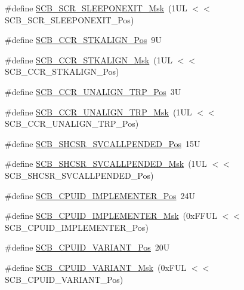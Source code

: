 \begin{DoxyCompactItemize}
\#define \mbox{\hyperlink{group___c_m_s_i_s___s_c_b_ga50a243e317b9a70781b02758d45b05ee}{S\+C\+B\+\_\+\+S\+C\+R\+\_\+\+S\+L\+E\+E\+P\+O\+N\+E\+X\+I\+T\+\_\+\+Msk}}~(1\+U\+L $<$$<$ S\+C\+B\+\_\+\+S\+C\+R\+\_\+\+S\+L\+E\+E\+P\+O\+N\+E\+X\+I\+T\+\_\+\+Pos)
\item 
\#define \mbox{\hyperlink{group___c_m_s_i_s___s_c_b_gac2d20a250960a432cc74da59d20e2f86}{S\+C\+B\+\_\+\+C\+C\+R\+\_\+\+S\+T\+K\+A\+L\+I\+G\+N\+\_\+\+Pos}}~9U
\item 
\#define \mbox{\hyperlink{group___c_m_s_i_s___s_c_b_ga33cf22d3d46af158a03aad25ddea1bcb}{S\+C\+B\+\_\+\+C\+C\+R\+\_\+\+S\+T\+K\+A\+L\+I\+G\+N\+\_\+\+Msk}}~(1\+U\+L $<$$<$ S\+C\+B\+\_\+\+C\+C\+R\+\_\+\+S\+T\+K\+A\+L\+I\+G\+N\+\_\+\+Pos)
\item 
\#define \mbox{\hyperlink{group___c_m_s_i_s___s_c_b_gac4e4928b864ea10fc24dbbc57d976229}{S\+C\+B\+\_\+\+C\+C\+R\+\_\+\+U\+N\+A\+L\+I\+G\+N\+\_\+\+T\+R\+P\+\_\+\+Pos}}~3U
\item 
\#define \mbox{\hyperlink{group___c_m_s_i_s___s_c_b_ga68c96ad594af70c007923979085c99e0}{S\+C\+B\+\_\+\+C\+C\+R\+\_\+\+U\+N\+A\+L\+I\+G\+N\+\_\+\+T\+R\+P\+\_\+\+Msk}}~(1\+U\+L $<$$<$ S\+C\+B\+\_\+\+C\+C\+R\+\_\+\+U\+N\+A\+L\+I\+G\+N\+\_\+\+T\+R\+P\+\_\+\+Pos)
\item 
\#define \mbox{\hyperlink{group___c_m_s_i_s___s_c_b_ga2f93ec9b243f94cdd3e94b8f0bf43641}{S\+C\+B\+\_\+\+S\+H\+C\+S\+R\+\_\+\+S\+V\+C\+A\+L\+L\+P\+E\+N\+D\+E\+D\+\_\+\+Pos}}~15U
\item 
\#define \mbox{\hyperlink{group___c_m_s_i_s___s_c_b_ga6095a7acfbad66f52822b1392be88652}{S\+C\+B\+\_\+\+S\+H\+C\+S\+R\+\_\+\+S\+V\+C\+A\+L\+L\+P\+E\+N\+D\+E\+D\+\_\+\+Msk}}~(1\+U\+L $<$$<$ S\+C\+B\+\_\+\+S\+H\+C\+S\+R\+\_\+\+S\+V\+C\+A\+L\+L\+P\+E\+N\+D\+E\+D\+\_\+\+Pos)
\item 
\#define \mbox{\hyperlink{group___c_m_s_i_s___s_c_b_ga58686b88f94f789d4e6f429fe1ff58cf}{S\+C\+B\+\_\+\+C\+P\+U\+I\+D\+\_\+\+I\+M\+P\+L\+E\+M\+E\+N\+T\+E\+R\+\_\+\+Pos}}~24U
\item 
\#define \mbox{\hyperlink{group___c_m_s_i_s___s_c_b_ga0932b31faafd47656a03ced75a31d99b}{S\+C\+B\+\_\+\+C\+P\+U\+I\+D\+\_\+\+I\+M\+P\+L\+E\+M\+E\+N\+T\+E\+R\+\_\+\+Msk}}~(0x\+F\+F\+U\+L $<$$<$ S\+C\+B\+\_\+\+C\+P\+U\+I\+D\+\_\+\+I\+M\+P\+L\+E\+M\+E\+N\+T\+E\+R\+\_\+\+Pos)
\item 
\#define \mbox{\hyperlink{group___c_m_s_i_s___s_c_b_ga104462bd0815391b4044a70bd15d3a71}{S\+C\+B\+\_\+\+C\+P\+U\+I\+D\+\_\+\+V\+A\+R\+I\+A\+N\+T\+\_\+\+Pos}}~20U
\item 
\#define \mbox{\hyperlink{group___c_m_s_i_s___s_c_b_gad358dfbd04300afc1824329d128b99e8}{S\+C\+B\+\_\+\+C\+P\+U\+I\+D\+\_\+\+V\+A\+R\+I\+A\+N\+T\+\_\+\+Msk}}~(0x\+F\+U\+L $<$$<$ S\+C\+B\+\_\+\+C\+P\+U\+I\+D\+\_\+\+V\+A\+R\+I\+A\+N\+T\+\_\+\+Pos)

\end{DoxyCompactItemize}
